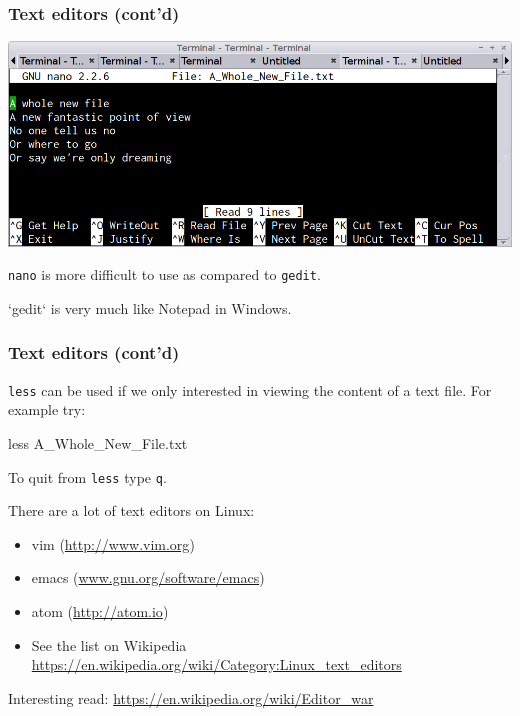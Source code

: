 \documentclass[english,11pt]{beamer}
\begin{document}
\begin{frame}[fragile]
\frametitle{Text editors (cont'd)}

{\centering
\includegraphics[scale=0.25]{images/nano1.png}
\par}

\verb|nano| is more difficult to use as compared to \verb|gedit|.

`gedit` is very much like Notepad in Windows.

\end{frame}


\begin{frame}[fragile]
\frametitle{Text editors (cont'd)}

\verb|less| can be used if we only interested in viewing the content
of a text file. For example try:
\begin{bashcode}
less A_Whole_New_File.txt
\end{bashcode}

To quit from \verb|less| type \verb|q|.

There are a lot of text editors on Linux:
\begin{itemize}
\item vim (\url{http://www.vim.org})
\item emacs (\url{www.gnu.org/software/emacs})
\item atom (\url{http://atom.io})
\item See the list on Wikipedia \url{https://en.wikipedia.org/wiki/Category:Linux_text_editors}
\end{itemize}

Interesting read: \url{https://en.wikipedia.org/wiki/Editor_war}

\end{frame}
\end{document}
